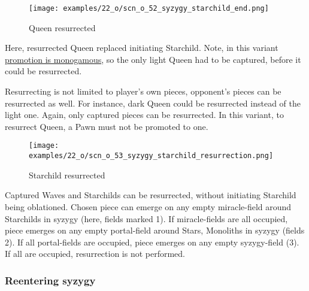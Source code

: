 \clearpage %

\vspace*{-2.1\baselineskip}
\noindent
\begin{figure}[!h]
\texttt{[image: examples/22\_o/scn\_o\_52\_syzygy\_starchild\_end.png]}
\vspace*{-1.4\baselineskip}
\caption{Queen resurrected}
\label{fig:scn_o_52_syzygy_starchild_end}
\end{figure}

\vspace*{-0.3\baselineskip}
Here, resurrected Queen replaced initiating Starchild. Note, in this variant
\hyperref[sec:One/Promotion]{promotion is monogamous}, so the only light Queen
had to be captured, before it could be resurrected.

Resurrecting is not limited to player's own pieces, opponent's pieces can be
resurrected as well. For instance, dark Queen could be resurrected instead of
the light one. Again, only captured pieces can be resurrected. In this variant,
to resurrect Queen, a Pawn must not be promoted to one.

\clearpage %

\vspace*{-2.1\baselineskip}
\noindent
\begin{figure}[!h]
\texttt{[image: examples/22\_o/scn\_o\_53\_syzygy\_starchild\_resurrection.png]}
\caption{Starchild resurrected}
\label{fig:scn_o_53_syzygy_starchild_resurrection}
\end{figure}

Captured Waves and Starchilds can be resurrected, without initiating Starchild
being oblationed. Chosen piece can emerge on any empty miracle-field around
Starchilds in syzygy (here, fields marked 1). If miracle-fields are all
occupied, piece emerges on any empty portal-field around Stars, Monoliths in
syzygy (fields 2). If all portal-fields are occupied, piece emerges on any
empty syzygy-field (3). If all are occupied, resurrection is not performed.

\clearpage %

\subsubsection*{Reentering syzygy}
\label{sec:One/Starchild/Syzygy/Reentering syzygy}

